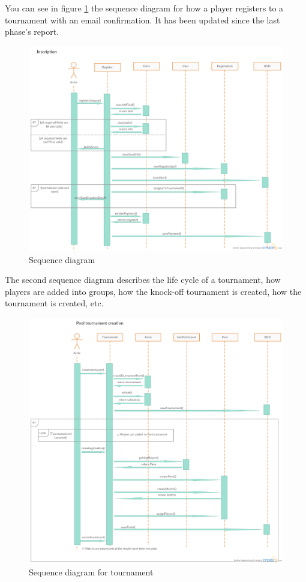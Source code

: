 \documentclass[a4paper, 12pt]{article}
\begin{document}
You can see in figure \ref{playerseq} the sequence diagram for how a player registers to a tournament with an email confirmation. It has been updated since the last phase's report.

\begin{figure}[position]
   \caption{\label{playerseq} Sequence diagram}
  \includegraphics[scale=0.4]{Inscription.png}
\end{figure}

The second sequence diagram describes the life cycle of a tournament, how players are added into groups, how the knock-off tournament is created, how the tournament is created, etc. 

\begin{figure}[position]
   \caption{\label{tournseq} Sequence diagram for tournament}
  \includegraphics[scale=0.4]{Tournament.png}
\end{figure}
\end{document}
